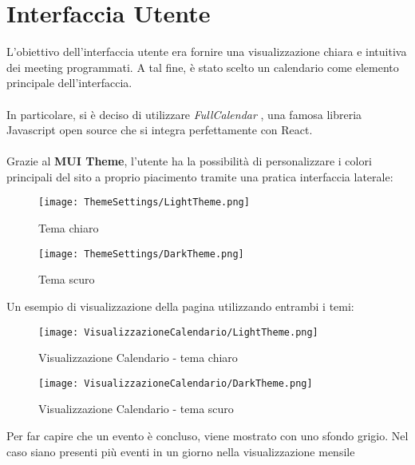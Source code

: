 \section{Interfaccia Utente}
L'obiettivo dell'interfaccia utente era fornire una visualizzazione chiara e intuitiva dei meeting programmati. 
A tal fine, è stato scelto un calendario come elemento principale dell'interfaccia.
\\\\
In particolare, si è deciso di utilizzare \textit{FullCalendar} \cite{FullCalendarSite},
una famosa libreria Javascript open source che si integra perfettamente con React.
\\\\
Grazie al \textbf{MUI Theme}, l'utente ha la possibilità di personalizzare i colori 
principali del sito a proprio piacimento tramite una pratica interfaccia laterale:
\begin{figure}[H]
    \centering
    \begin{minipage}{0.45\textwidth}
        \centering
        \texttt{[image: ThemeSettings/LightTheme.png]}
        \caption{Tema chiaro}
    \end{minipage}
    \hspace{0.05\textwidth}
    \begin{minipage}{0.45\textwidth}
        \centering
        \texttt{[image: ThemeSettings/DarkTheme.png]}
        \caption{Tema scuro}
    \end{minipage}
\end{figure}
\clearpage
\noindent Un esempio di visualizzazione della pagina utilizzando entrambi i temi:
\begin{figure}[H]   
    \centering
    \texttt{[image: VisualizzazioneCalendario/LightTheme.png]}
    \caption{Visualizzazione Calendario - tema chiaro}
    \label{fig:visualizzazioneCalendario}
\end{figure}
\begin{figure}[H]
    \centering
    \texttt{[image: VisualizzazioneCalendario/DarkTheme.png]}
    \caption{Visualizzazione Calendario - tema scuro}
\end{figure}
\noindent Per far capire che un evento è concluso, viene mostrato con uno sfondo grigio.
\noindent  Nel caso siano presenti più eventi in un giorno nella visualizzazione mensile 
